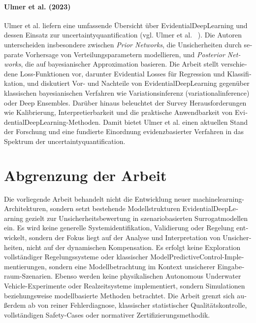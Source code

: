 

\begin{otherlanguage}{ngerman}

\paragraph{Ulmer et al. (2023)} Ulmer et al. liefern eine umfassende Übersicht über \gls{EvidentialDeepLearning} und dessen Einsatz zur \gls{uncertaintyquantification} (vgl. Ulmer et al. ~\parencite{Ulmer2023}). Die Autoren unterscheiden insbesondere zwischen \emph{Prior Networks}, die Unsicherheiten durch separate Vorhersage von Verteilungsparametern modellieren, und \emph{Posterior Networks}, die auf bayesianischer Approximation basieren. Die Arbeit stellt verschiedene Loss-Funktionen vor, darunter Evidential Losses für Regression und Klassifikation, und diskutiert Vor- und Nachteile von \gls{EvidentialDeepLearning} gegenüber klassischen bayesianischen Verfahren wie Variationsinferenz (\gls{variationalinference}) oder Deep Ensembles. Darüber hinaus beleuchtet der Survey Herausforderungen wie Kalibrierung, Interpretierbarkeit und die praktische Anwendbarkeit von \gls{EvidentialDeepLearning}-Methoden. Damit bietet Ulmer et al. einen aktuellen Stand der Forschung und eine fundierte Einordnung evidenzbasierter Verfahren in das Spektrum der \gls{uncertaintyquantification}. 



\section{Abgrenzung der Arbeit}

Die vorliegende Arbeit behandelt nicht die Entwicklung neuer \gls{machinelearning}-Architekturen, sondern setzt bestehende Modellstrukturen \gls{EvidentialDeepLearning} gezielt zur Unsicherheitsbewertung in szenariobasierten Surrogatmodellen ein. Es wird keine generelle Systemidentifikation, Validierung oder Regelung entwickelt, sondern der Fokus liegt auf der Analyse und Interpretation von Unsicherheiten, nicht auf der dynamischen Kompensation.
Es erfolgt keine Exploration vollständiger Regelungssysteme oder klassischer \gls{ModelPredictiveControl}-Implementierungen, sondern eine Modellbetrachtung im Kontext unsicherer Eingaberaum-Szenarien. Ebenso werden keine physikalischen \gls{Autonomous Underwater Vehicle}-Experimente oder Realzeitsysteme implementiert, sondern Simulationen beziehungsweise modellbasierte Methoden betrachtet. Die Arbeit grenzt sich außerdem ab von reiner Fehlerdiagnose, klassischer statistischer Qualitätskontrolle, vollständigen Safety-Cases oder normativer Zertifizierungsmethodik. %



\end{otherlanguage}
